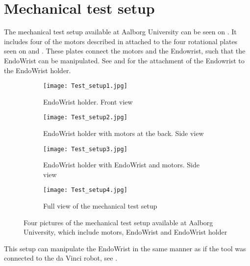 \section{Mechanical test setup}\label{sec:Mechanical_testsetup.tex}
The mechanical test setup available at Aalborg University can be seen on . It includes four of the motors described in  attached to the four rotational plates seen on  and . These plates connect the motors and the Endowrist, such that the EndoWrist can be manipulated. See  and  for the attachment of the Endowrist to the EndoWrist holder.  

\begin{figure}[H]
	\centering
	\begin{minipage}[t]{0.9\textwidth}
	\begin{subfigure}{0.45\textwidth}
		\vspace{-10pt}
		\centering
		\texttt{[image: Test\_setup1.jpg]}
		\caption{EndoWrist holder. Front view}
		\label{fig:Mec_a}
	\end{subfigure}
	\hspace{\fill}
	\begin{subfigure}{0.45\textwidth}
		\centering
		\texttt{[image: Test\_setup2.jpg]}
		\caption{EndoWrist holder with motors at the back. Side view}
		\label{fig:Mec_b}
	\end{subfigure}
	\end{minipage}

	\begin{minipage}[t]{0.9\textwidth}
	\vspace{20pt}
	\begin{subfigure}{0.45\textwidth}
		\vspace{0pt}
		\centering
		\texttt{[image: Test\_setup3.jpg]}
		\caption{EndoWrist holder with EndoWrist and motors. Side view}
		\label{fig:Mec_c}
	\end{subfigure}
	\hspace{\fill}
	\begin{subfigure}{0.45\textwidth}
		\centering
		\texttt{[image: Test\_setup4.jpg]}
		\caption{Full view of the mechanical test setup}
		\label{fig:Mec_d}
	\end{subfigure}
	\end{minipage}

	\caption{Four pictures of the mechanical test setup available at Aalborg University, which include motors, EndoWrist and EndoWrist holder}
	\label{fig:Mec_abcd}
\end{figure}

This setup can manipulate the EndoWrist in the same manner as if the tool was connected to the da Vinci robot, see .
